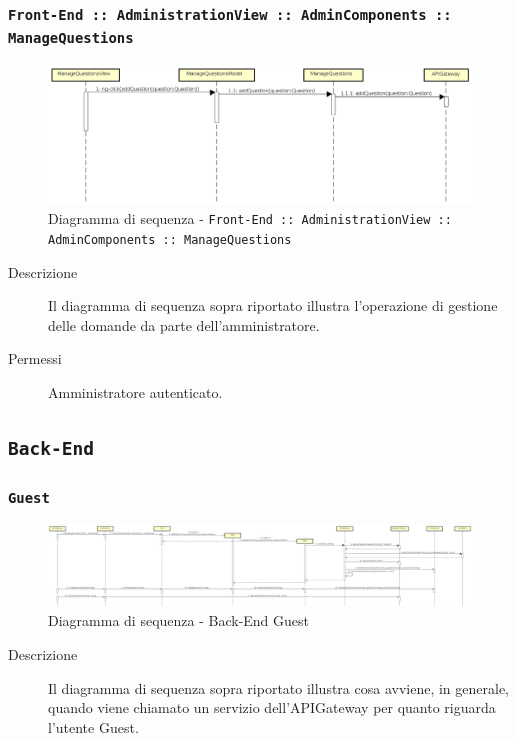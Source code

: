 \documentclass[../DefinizioneDiProdotto.tex]{subfiles}
\begin{document}
		\subsubsection{\texttt{Front-End :: AdministrationView :: AdminComponents :: ManageQuestions}}
		\begin{figure}[!h]
			\centering
			\includegraphics[width=\textwidth]{DiagrammiSequenza/Front-End/AdministrationView/ManageQuestions.png}
			\caption{Diagramma di sequenza - \texttt{Front-End :: AdministrationView :: AdminComponents :: ManageQuestions }}
		\end{figure}
		\begin{description}
			\item [Descrizione] Il diagramma di sequenza sopra riportato illustra l'operazione di gestione delle domande da parte dell'amministratore.
			\item [Permessi] Amministratore autenticato.
		\end{description}

	\subsection{\texttt{Back-End}}
		\subsubsection{\texttt{Guest}}
		\begin{figure}[!h]
			\centering
			\includegraphics[width=\textwidth]{DiagrammiSequenza/Back-End/DiagrammaSequenzaBackendGuest.png}
			\caption{Diagramma di sequenza - Back-End Guest }
		\end{figure}
		\begin{description}
			\item [Descrizione] Il diagramma di sequenza sopra riportato illustra cosa avviene, in generale, quando viene chiamato un servizio dell'APIGateway per quanto riguarda l'utente Guest.
		\end{description}
\end{document}

